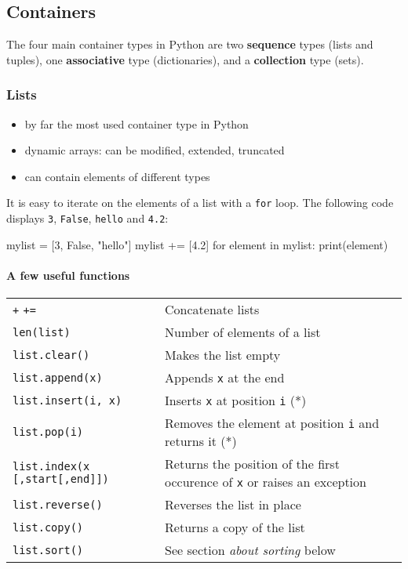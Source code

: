 \documentclass[twocolumn]{article}
\let\oldparagraph\paragraph
\renewcommand{\paragraph}[1]{\oldparagraph{#1}\mbox{}}
\begin{document}
\subsection{Containers}\label{containers}

The four main container types in Python are two \textbf{sequence} types (lists and tuples), one \textbf{associative} type (dictionaries), and a \textbf{collection} type (sets).

\subsubsection{Lists}\label{lists}

\begin{itemize}
\item by far the most used container type in Python
\item dynamic arrays: can be modified, extended, truncated
\item can contain elements of different types
\end{itemize}

It is easy to iterate on the elements of a list with a \texttt{for} loop. The following code displays \texttt{3}, \texttt{False}, \texttt{hello} and \texttt{4.2}:
\begin{python}
mylist = [3, False, "hello"]
mylist += [4.2]
for element in mylist:
    print(element)
\end{python}

\paragraph{A few useful functions}\label{listusefulfunc}

\begin{tabular}{|p{3.25cm}|p{5cm}|}
\hline
\texttt{+} \texttt{+=} & Concatenate lists \\
\texttt{len(list)} & Number of elements of a list \\
\texttt{list.clear()} & Makes the list empty \\
\texttt{list.append(x)} & Appends \texttt{x} at the end \\
\texttt{list.insert(i, x)} & Inserts \texttt{x} at position \texttt{i} (*) \\
\texttt{list.pop(i)} & Removes the element at position \texttt{i} and returns it (*) \\
\texttt{list.index(x [,start[,end]])} & Returns the position of the first occurence of \texttt{x} or raises an exception \\
\texttt{list.reverse()} & Reverses the list in place \\
\texttt{list.copy()} & Returns a copy of the list \\
\texttt{list.sort()} & See section \textit{about sorting} below \\\hline
\end{tabular}
\end{document}

